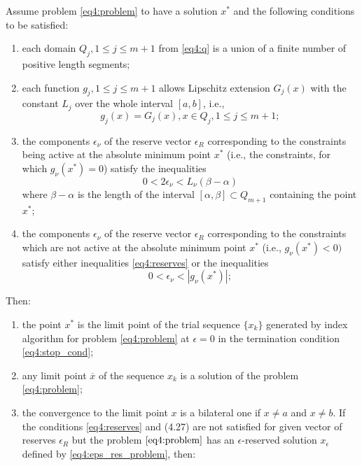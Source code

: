 \documentclass[graybox]{svmult}
\begin{document}
\begin{theorem}
  Assume problem \eqref{eq4:problem} to have a solution $x^*$ and the following conditions to be satisfied:
  \begin{enumerate}
    \item each domain $Q_j ,1\le j\le m+1$ from \eqref{eq4:q} is a union of a finite number of positive length segments;
    \item each function $g_j ,1\le j\le m+1$ allows Lipschitz extension $G_j (x)$ with the constant $L_j$ over the whole interval $[a,b]$, i.e.,
    \begin{equation}
      g_j(x)=G_j(x),x\in Q_j,1\le j\le m+1;
    \end{equation}
    \item the components $\epsilon_\nu$ of the reserve vector $\epsilon_R$ corresponding to the constraints being active at the absolute minimum point $x^*$ (i.e., the constraints, for which $g_\nu(x^*)=0$) satisfy the inequalities
    \begin{equation}
      \label{eq4:reserves}
      0<2\epsilon_\nu<L_\nu(\beta-\alpha)
    \end{equation}
    where $\beta-\alpha$ is the length of the interval $[\alpha,\beta]\subset Q_{m + 1}$ containing the point $x^*$;
    \item the components $\epsilon_\nu$ of the reserve vector $\epsilon_R$ corresponding to the constraints which are not active at the absolute minimum point $x^*$ (i.e., $g_\nu(x^* )<0)$ satisfy either inequalities \eqref{eq4:reserves} or the inequalities
    \begin{equation}
      0< \epsilon_\nu <|g_\nu (x^* )|;
    \end{equation}
  \end{enumerate}

  Then:
  \begin{enumerate}
    \item the point $x^*$ is the limit point of the trial sequence $\{x_k \}$ generated by index algorithm for problem \eqref{eq4:problem} at $\epsilon =0$ in the termination condition \eqref{eq4:stop_cond};
    \item any limit point $\overline x$ of the sequence ${x_k }$ is a solution of the problem \eqref{eq4:problem};
    \item the convergence to the limit point $x$ is a bilateral one if $x\not=a$ and $x\not=b$.
    If the conditions \eqref{eq4:reserves} and (4.27) are not satisfied for given vector of reserves $\epsilon_R$ but the
    problem $\eqref{eq4:problem}$ has an $\epsilon$-reserved solution $x_\epsilon$ defined by \eqref{eq4:eps_res_problem}, then:


\end{enumerate}
\end{theorem}
\end{document}
